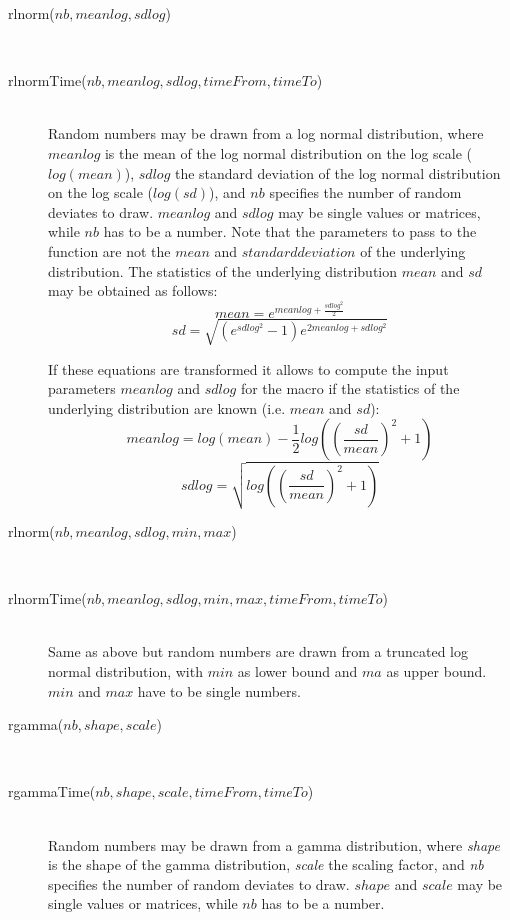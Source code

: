 \documentclass[letterpaper,12pt,oneside]{book}
\begin{document}
\begin{description}
\item[rlnorm($nb, meanlog, sdlog$)]\hspace*{\fill}\\
\vspace{-9mm}
\item[rlnormTime($nb, meanlog, sdlog, timeFrom, timeTo$)]\hspace*{\fill}\\
Random numbers may be drawn from a log normal distribution, where $meanlog$ is the mean of the log normal distribution on the log scale ($log(mean)$), $sdlog$ the standard deviation of the log normal distribution on the log scale ($log(sd)$), and $nb$ specifies the number of random deviates to draw. $meanlog$ and $sdlog$ may be single values or matrices, while $nb$ has to be a number. Note that the parameters to pass to the function are not the $mean$ and $standard deviation$ of the underlying distribution. The statistics of the underlying distribution $mean$ and $sd$ may be obtained as follows:
	\[mean = e^{meanlog+\frac{sdlog^{2}}{2}}  \]
	\[sd = \sqrt{(e^{sdlog^{2}}-1)e^{2meanlog+sdlog^{2}}} \]
  
If these equations are transformed it allows to compute the input parameters $meanlog$ and $sdlog$ for the macro if the statistics of the underlying distribution are known (i.e. $mean$ and $sd$):
	\[meanlog = log\left(mean\right)-\frac{1}{2}log\left(\left(\frac{sd}{mean}\right)^2+1\right) \]
	\[sdlog = \sqrt{log\left(\left(\frac{sd}{mean}\right)^2+1\right)} \]

\item[rlnorm($nb, meanlog, sdlog, min, max$)]\hspace*{\fill}\\
\vspace{-9mm}
\item[rlnormTime($nb, meanlog, sdlog, min, max, timeFrom, timeTo$)]\hspace*{\fill}\\
Same as above but random numbers are drawn from a truncated log normal distribution, with $min$ as lower bound and $ma$ as upper bound. $min$ and $max$ have to be single numbers.

\item[rgamma($nb, shape, scale$)]\hspace*{\fill}\\
\vspace{-9mm}
\item[rgammaTime($nb, shape, scale, timeFrom, timeTo$)]\hspace*{\fill}\\
Random numbers may be drawn from a gamma distribution, where \textit{shape} is the shape of the gamma distribution, \textit{scale} the scaling factor, and \textit{nb} specifies the number of random deviates to draw. $shape$ and $scale$ may be single values or matrices, while $nb$ has to be a number.


\end{description}
\end{document}
